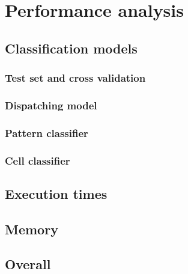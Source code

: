 \section{Performance analysis}
\label{sec:thyroid_perf}

\subsection{Classification models}
\label{ssec:thyroid_perf_models}
\subsubsection{Test set and cross validation}
\subsubsection{Dispatching model}
\subsubsection{Pattern classifier}
\subsubsection{Cell classifier}

\subsection{Execution times}

\subsection{Memory}

\subsection{Overall}